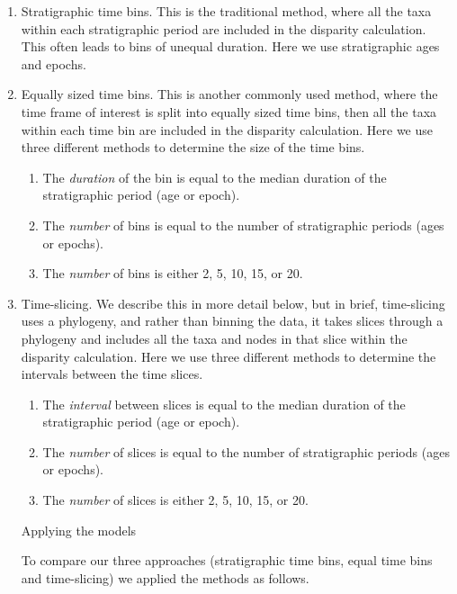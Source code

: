 \documentclass[12pt,a4paper]{article}
\begin{document}
\begin{enumerate}
  \item Stratigraphic time bins. This is the traditional method, where all the taxa within each stratigraphic period are included in the disparity calculation. This often leads to bins of unequal duration. Here we use stratigraphic ages and epochs.
  \item Equally sized time bins. This is another commonly used method, where the time frame of interest is split into equally sized time bins, then all the taxa within each time bin are included in the disparity calculation. Here we use three different methods to determine the size of the time bins. 
    \begin{enumerate}
      \item The \textit{duration} of the bin is equal to the median duration of the stratigraphic period (age or epoch).
      \item The \textit{number} of bins is equal to the number of stratigraphic periods (ages or epochs).
      \item The \textit{number} of bins is either 2, 5, 10, 15, or 20.
    \end{enumerate}
  \item Time-slicing. We describe this in more detail below, but in brief, time-slicing uses a phylogeny, and rather than binning the data, it takes slices through a phylogeny and includes all the taxa and nodes in that slice within the disparity calculation. Here we use three different methods to determine the intervals between the time slices.
    \begin{enumerate}
      \item The \textit{interval} between slices is equal to the median duration of the stratigraphic period (age or epoch).
      \item The \textit{number} of slices is equal to the number of stratigraphic periods (ages or epochs).
      \item The \textit{number} of slices is either 2, 5, 10, 15, or 20.
    \end{enumerate}  

Applying the models

To compare our three approaches (stratigraphic time bins, equal time bins and time-slicing) we applied the methods as follows. 


\end{enumerate}
\end{document}
